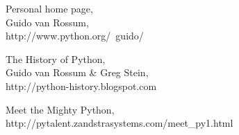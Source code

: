 \documentclass[11pt]{scrartcl}
\begin{document}
\begin{thebibliography}{9}

      Personal home page,\\
      Guido van Rossum,\\
      http://www.python.org/~guido/
    
        The History of Python,\\
        Guido van Rossum \& Greg Stein,\\
        http://python-history.blogspot.com

        Meet the Mighty Python,\\
        http://pytalent.zandstrasystems.com/meet\_py1.html
\end{thebibliography}
\end{document}
